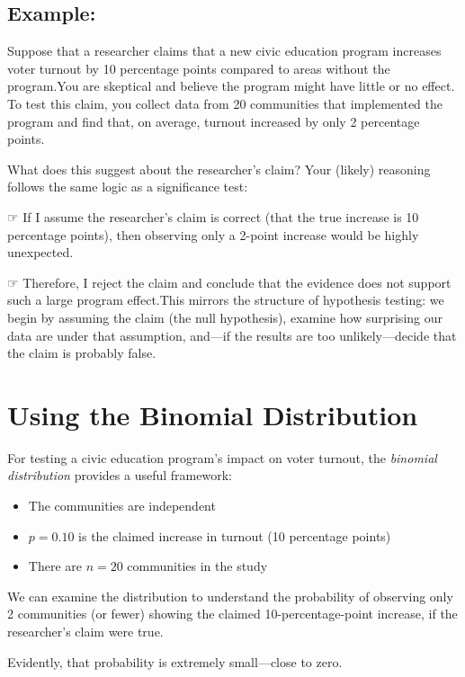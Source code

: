 \documentclass[
  letterpaper,
  DIV=11,
  numbers=noendperiod]{scrreprt}
\providecommand{\tightlist}{%
  \setlength{\itemsep}{0pt}\setlength{\parskip}{0pt}}
\begin{document}
\subsection{Example:}\label{example}

Suppose that a researcher claims that a new civic education program
increases voter turnout by 10 percentage points compared to areas
without the program.You are skeptical and believe the program might have
little or no effect. To test this claim, you collect data from 20
communities that implemented the program and find that, on average,
turnout increased by only 2 percentage points.

What does this suggest about the researcher's claim? Your (likely)
reasoning follows the same logic as a significance test:

☞ If I assume the researcher's claim is correct (that the true increase
is 10 percentage points), then observing only a 2-point increase would
be highly unexpected.

☞ Therefore, I reject the claim and conclude that the evidence does not
support such a large program effect.This mirrors the structure of
hypothesis testing: we begin by assuming the claim (the null
hypothesis), examine how surprising our data are under that assumption,
and---if the results are too unlikely---decide that the claim is
probably false.

\section{Using the Binomial
Distribution}\label{using-the-binomial-distribution}

For testing a civic education program's impact on voter turnout, the
\emph{binomial distribution} provides a useful framework:

\begin{itemize}
\tightlist
\item
  The communities are independent
\item
  \(p = 0.10\) is the claimed increase in turnout (10 percentage points)
\item
  There are \(n = 20\) communities in the study
\end{itemize}

We can examine the distribution to understand the probability of
observing only 2 communities (or fewer) showing the claimed
10-percentage-point increase, if the researcher's claim were true.

Evidently, that probability is extremely small---close to zero.
\end{document}
